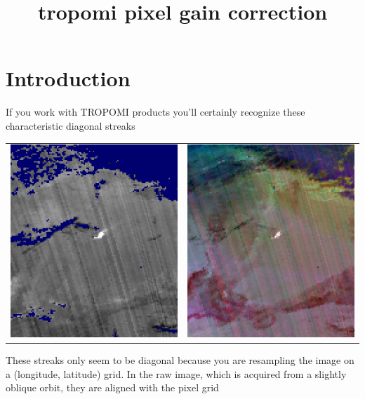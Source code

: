 \documentclass[a4paper]{article}    %
\theoremstyle{note}
\theoremstyle{plain}
\begin{document}
\title{tropomi pixel gain correction}
\date{}
\maketitle


\section{Introduction}

If you work with TROPOMI products you'll certainly recognize these
characteristic diagonal streaks

\begin{tabular}{ll}
	\includegraphics[width=.4\textwidth]{f/kccplume20b.png} &
	\includegraphics[width=.4\textwidth]{f/ikniceshot.png} \\
\end{tabular}

These streaks only seem to be diagonal because you are resampling the image on a
(longitude, latitude) grid.  In the raw image, which is acquired from a
slightly oblique orbit, they are aligned with the pixel grid
\end{document}
